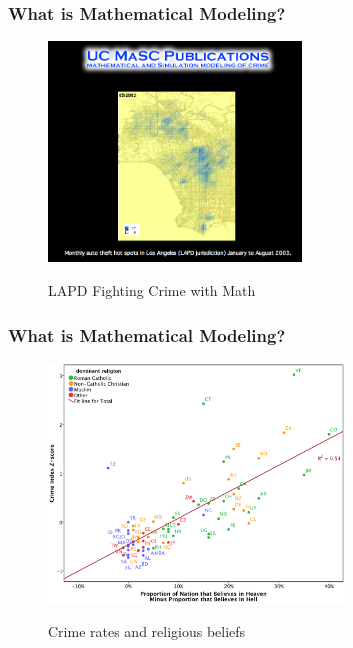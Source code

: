 \documentclass[hyperref={colorlinks=false},compress,handout,10pt]{beamer}
\begin{document}
\begin{frame}
    \frametitle{What is Mathematical Modeling?}
    \begin{figure}
        \centering
        \caption{{LAPD Fighting Crime with Math}}
        \href{http://www.youtube.com/watch?v=HZ7fLuO7zb4}{\includegraphics[width=0.6\textwidth]{LAPDUCLA.png}}
        \label{fig:LAPDUCLA}
    \end{figure}
\end{frame}

\begin{frame}[fragile]
    \frametitle{What is Mathematical Modeling?}
        \begin{figure}
            \centering
            \caption{Crime rates and religious beliefs}
            \href{http://www.economist.com/blogs/graphicdetail/2012/09/daily-chart/}{
            \includegraphics[width=0.7\textwidth]{images/hellvsheaven.png}}
    \end{figure}
\end{frame}
\end{document}
